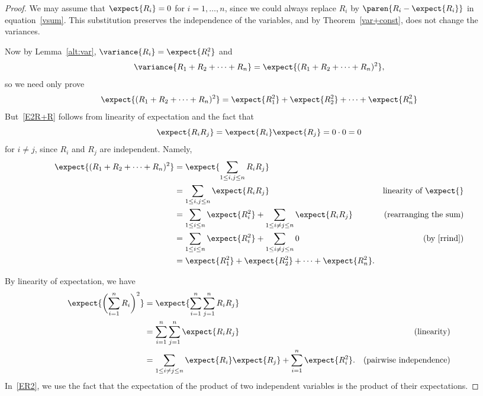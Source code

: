 \begin{editingnotes}

\begin{proof}
  We may assume that $\expect{R_i} = 0$ for $i=1,\dots,n$, since we could
  always replace $R_i$ by $\paren{R_i-\expect{R_i}}$ in
  equation~\eqref{vsum}.  This substitution preserves the independence of
  the variables, and by Theorem~\ref{var+const}, does not change the
  variances.

  Now by Lemma~\ref{alt:var}, $\variance{R_i} = \expect{R_i^2}$ and
\[
\variance{R_1+R_2+\cdots+R_n} = \expect{(R_1+R_2+\cdots+R_n)^2},
\]
so we need only prove
\begin{equation}\label{E2R+R}
\expect{(R_1+R_2+\cdots+R_n)^2} = \expect{R_1^2} + \expect{R_2^2} + \cdots
+ \expect{R_n^2}
\end{equation}
But~\eqref{E2R+R} follows from linearity of expectation and the fact that
\begin{equation}\label{rrind}
\expect{R_iR_j} = \expect{R_i}\expect{R_j} = 0 \cdot 0 = 0
\end{equation}
for $i \neq j$, since $R_i$ and $R_j$ are independent.  Namely,
\begin{align*}
\expect{(R_1+R_2+\cdots+R_n)^2}
   & = \expect{\sum_{1\leq i,j \leq n} R_iR_j}\\
   & = \sum_{1\leq i,j \leq n} \expect{R_iR_j} & \text{linearity of $\expect{}$}\\
   & = \sum_{1 \leq i \leq n} \expect{R_i^2}
             + \sum_{1 \leq i \neq j \leq n} \expect{R_iR_j} &
             \text{(rearranging the sum)}\\
   & = \sum_{1 \leq i \leq n} \expect{R_i^2}
            + \sum_{1 \leq i \neq j \leq n} 0
             & \text{(by~\eqref{rrind})}\\
   & =  \expect{R_1^2} + \expect{R_2^2} + \cdots + \expect{R_n^2}.
\end{align*}

\iffalse
By linearity of expectation, we have
\begin{align}
\expect{\biggl(\sum_{i=1}^n R_i\biggr)^2} &
    = \expect{\sum_{i=1}^n \sum_{j=1}^n R_i R_j} \notag\\
   &  = \sum_{i=1}^n \sum_{j=1}^n \expect{R_i R_j} & \text{(linearity)}\notag\\
   & = \sum_{1\le i \neq j \le n} \expect{R_i}\expect{R_j} + \sum_{i=1}^n
     \expect{R_i^2}.
       & \text{(pairwise independence)} \label{ER2}
\end{align}
In~\eqref{ER2}, we use the fact that the expectation
of the product of two independent variables is the product of their
expectations.


\end{proof}
\end{editingnotes}
